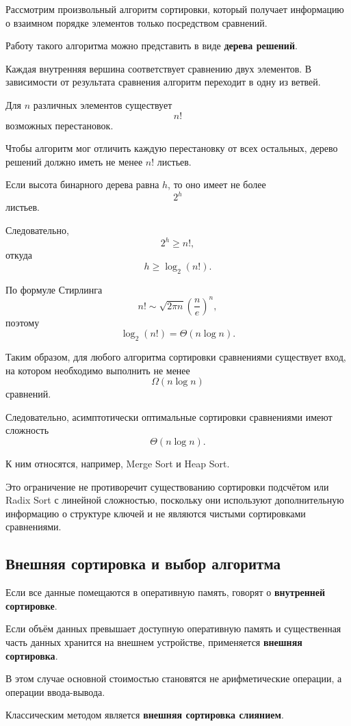 Рассмотрим произвольный алгоритм сортировки, который получает информацию
о взаимном порядке элементов только посредством сравнений.

Работу такого алгоритма можно представить в виде
\textbf{дерева решений}.

Каждая внутренняя вершина соответствует сравнению двух элементов.
В зависимости от результата сравнения алгоритм переходит в одну из ветвей.

Для $n$ различных элементов существует
\[
n!
\]
возможных перестановок.

Чтобы алгоритм мог отличить каждую перестановку от всех остальных,
дерево решений должно иметь не менее $n!$ листьев.

Если высота бинарного дерева равна $h$, то оно имеет не более
\[
2^h
\]
листьев.

Следовательно,
\[
2^h \geq n!,
\]
откуда
\[
h \geq \log_2(n!).
\]

По формуле Стирлинга
\[
n! \sim \sqrt{2\pi n}
\left(\frac{n}{e}\right)^n,
\]
поэтому
\[
\log_2(n!)=\Theta(n\log n).
\]

Таким образом, для любого алгоритма сортировки сравнениями существует
вход, на котором необходимо выполнить не менее
\[
\Omega(n\log n)
\]
сравнений.

Следовательно, асимптотически оптимальные сортировки сравнениями имеют
сложность
\[
\Theta(n\log n).
\]

К ним относятся, например, Merge Sort и Heap Sort.

Это ограничение не противоречит существованию сортировки подсчётом или
Radix Sort с линейной сложностью, поскольку они используют дополнительную
информацию о структуре ключей и не являются чистыми сортировками
сравнениями.


\subsection{Внешняя сортировка и выбор алгоритма}

Если все данные помещаются в оперативную память, говорят о
\textbf{внутренней сортировке}.

Если объём данных превышает доступную оперативную память и существенная
часть данных хранится на внешнем устройстве, применяется
\textbf{внешняя сортировка}.

В этом случае основной стоимостью становятся не арифметические операции,
а операции ввода-вывода.

Классическим методом является
\textbf{внешняя сортировка слиянием}.

